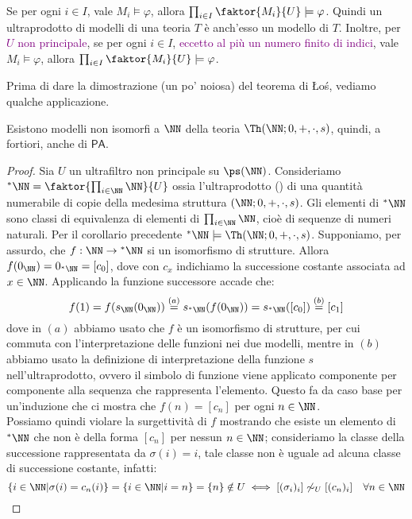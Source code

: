 \begin{corollary}
    Se per ogni $i \in I$, vale $M_i \models \varphi$, allora $\prod_{i \in I} \faktor{M_i}{U} \models \varphi$.
    Quindi un ultraprodotto di modelli di una teoria $T$ è anch'esso un modello di $T$. Inoltre, per \textcolor{purple}{$U$ non principale},
    se per ogni $i \in I$, \textcolor{purple}{eccetto al più un numero finito di indici}, vale $M_i \models \varphi$, allora $\prod_{i \in I} \faktor{M_i}{U} \models \varphi$.
\end{corollary}

Prima di dare la dimostrazione (un po' noiosa) del teorema di Łoś, vediamo qualche applicazione.

\begin{example}
    Esistono modelli non isomorfi a $\NN$ della teoria $\Th(\NN; 0,+,\cdot,s)$, quindi, a fortiori, anche di $\mathsf{PA}$.
\end{example}

\begin{proof}
    Sia $U$ un ultrafiltro non principale su $\ps(\NN)$. Consideriamo ${}^*\NN = \faktor{\prod_{i \in \NN}\NN}{U}$ ossia l'ultraprodotto () di una quantità numerabile di copie della medesima struttura $(\NN;0,+,\cdot,s)$.
    Gli elementi di ${}^*\NN$ sono classi di equivalenza di elementi di $\prod_{i \in \NN}\NN$, cioè di sequenze di numeri naturali. Per il corollario precedente ${}^*\NN \models \Th(\NN;0,+,\cdot,s)$. Supponiamo, per assurdo, che $f : \NN \to {}^*\NN$ si un isomorfismo di strutture.
    Allora $f(0_\NN) = 0_{{}^*\NN} = [c_0]$, dove con $c_x$ indichiamo la successione costante associata ad $x \in \NN$. Applicando la funzione successore accade che:
    \[ f(1) = f(s_\NN(0_\NN)) \overset{(a)}{=} s_{{}^*\NN}(f(0_\NN)) = s_{{}^*\NN}([c_0]) \overset{(b)}{=} [c_1]
    \] 
    dove in $(a)$ abbiamo usato che $f$ è un isomorfismo di strutture, per cui commuta con l'interpretazione delle funzioni nei due modelli, mentre in $(b)$ abbiamo usato la definizione di interpretazione della funzione $s$ nell'ultraprodotto,
    ovvero il simbolo di funzione viene applicato componente per componente alla sequenza che rappresenta l'elemento. Questo fa da caso base per un'induzione che ci mostra che $f(n) = [c_n]$ per ogni $n \in \NN$.\\
    Possiamo quindi violare la surgettività di $f$ mostrando che esiste un elemento di ${}^*\NN$ che non è della forma $[c_n]$ per nessun $n \in \NN$; consideriamo la classe della successione rappresentata da $\sigma(i) = i$, tale classe non è uguale ad alcuna classe di successione costante, infatti:
    \[ \{i \in \NN | \sigma(i) = c_n(i)\} = \{i \in \NN | i = n\} = \{n\} \notin U \iff [(\sigma_i)_i] \not \sim _U [(c_n)_i] \quad \forall n \in \NN
    \]
\end{proof}

